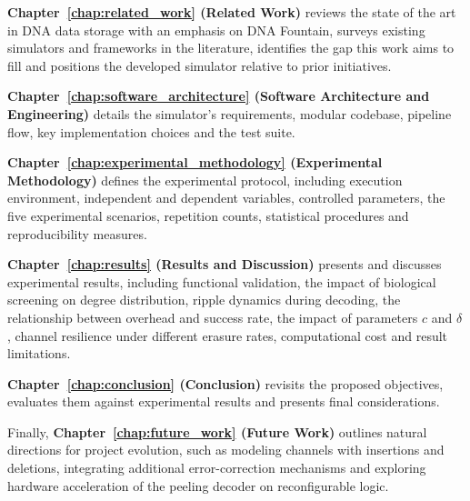 \textbf{Chapter~\ref{chap:related_work} (Related Work)} reviews the state of the art in DNA data storage with an emphasis on DNA Fountain, surveys existing simulators and frameworks in the literature, identifies the gap this work aims to fill and positions the developed simulator relative to prior initiatives.

\textbf{Chapter~\ref{chap:software_architecture} (Software Architecture and Engineering)} details the simulator's requirements, modular codebase, pipeline flow, key implementation choices and the test suite.

\textbf{Chapter~\ref{chap:experimental_methodology} (Experimental Methodology)} defines the experimental protocol, including execution environment, independent and dependent variables, controlled parameters, the five experimental scenarios, repetition counts, statistical procedures and reproducibility measures.

\textbf{Chapter~\ref{chap:results} (Results and Discussion)} presents and discusses experimental results, including functional validation, the impact of biological screening on degree distribution, ripple dynamics during decoding, the relationship between overhead and success rate, the impact of parameters $c$ and $\delta$, channel resilience under different erasure rates, computational cost and result limitations.

\textbf{Chapter~\ref{chap:conclusion} (Conclusion)} revisits the proposed objectives, evaluates them against experimental results and presents final considerations.

Finally, \textbf{Chapter~\ref{chap:future_work} (Future Work)} outlines natural directions for project evolution, such as modeling channels with insertions and deletions, integrating additional error-correction mechanisms and exploring hardware acceleration of the peeling decoder on reconfigurable logic.
